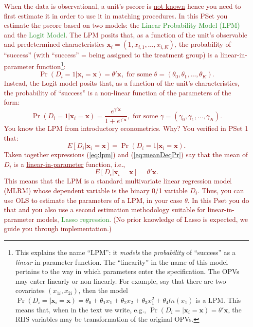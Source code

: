 \documentclass[
]{article}
\begin{document}
\noindent \textcolor{Maroon}{When the data is observational, a unit's pscore is \underline{not known} hence you need to first estimate it in order to use it in matching procedures. In this PSet you estimate the pscore based on two models: the \textcolor{ForestGreen}{Linear Probability Model (LPM)} and the \textcolor{ForestGreen}{Logit Model}. The LPM posits that, as a function of the unit's observable and predetermined characteristics $\mathbf{x}_i=(1, x_{i,1},\ldots,x_{i,K})$, the probability of ``success'' (with ``success'' = being assigned to the treatment group) is a linear-in-parameter function\footnote{This explains the name ``LPM'': it \textit{models} the \textit{probability} of “success” as a \textit{linear}-in-parameter function. The ``linearity'' in the name of this model pertains to the way in which parameters enter the specification. The OPVs may enter linearly or non-linearly. For example, say that there are two covariates $(x_{1i},x_{2i})$, then the model $\Pr(D_i=|\mathbf{x}_i=\mathbf{x})=\theta_0+\theta_1 x_{1}+\theta_2 x_{2}+\theta_3 x_{1}^2+\theta_4 ln(x_{1})$ is a LPM. This means that, when in the text we write, e.g., $\Pr(D_i=|\mathbf{x}_i=\mathbf{x})=\theta'\mathbf{x}$, the RHS variables may be transformation of the original OPVs.}:
\begin{equation}\label{eq:lpm}
\Pr(D_i=1|\mathbf{x}_i=\mathbf{x})=\theta'\mathbf{x}, \text{ for some } \theta=(\theta_0,\theta_1, \ldots, \theta_K).
\end{equation}
\noindent Instead, the Logit model posits that, as a function of the unit's characteristics, the probability of ``success'' is a non-linear function of the parameters of the form:
\begin{equation}\label{eq:logit}
\Pr(D_i=1|\mathbf{x}_i=\mathbf{x})=\frac{e^{\gamma'\mathbf{x}}}{1 + e^{\gamma'\mathbf{x}}}, \text{ for some } \gamma=(\gamma_0,\gamma_1, \ldots, \gamma_K).
\end{equation}
\noindent You know the LPM from introductory econometrics. Why? You verified in PSet 1 that: 
\begin{equation}\label{eq:meanDeqPr}
E[D_i|\mathbf{x}_i=\mathbf{x}]=\Pr(D_i=1|\mathbf{x}_i=\mathbf{x}).
\end{equation}
Taken together expressions (\ref{eq:lpm}) and (\ref{eq:meanDeqPr}) say that the mean of $D_i$ is a \underline{linear-in-parameter} function, i.e., 
\begin{equation}\label{eq:meanLPM}
E[D_i|\mathbf{x}_i=\mathbf{x}]=\theta'\mathbf{x}. 
\end{equation}
This means that the LPM is a standard multivariate linear regression model (MLRM) whose dependent variable is the binary 0/1 variable $D_i$. Thus, you can use OLS to estimate the parameters of a LPM, in your case $\theta$. In this Pset you do that and you also use a second estimation methodology suitable for linear-in-parameter models, \textcolor{ForestGreen}{Lasso regression}. (No prior knowledge of Lasso is expected, we guide you through implementation.)}
\end{document}
